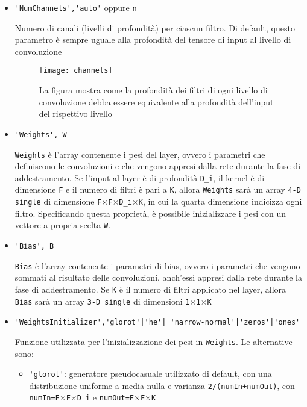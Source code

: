 \begin{itemize}
	\item \verb|'NumChannels','auto'| oppure \verb|n|
	
	Numero di canali (livelli di profondità) per ciascun filtro. Di default, questo parametro è sempre uguale alla profondità del tensore di input al livello di convoluzione
	
	\begin{figure}[h]
		\centering
		\texttt{[image: channels]}
		\caption[Profondità dei filtri attraverso una CNN]{La figura mostra come la profondità dei filtri di ogni livello di convoluzione debba essere equivalente alla profondità dell'input del rispettivo livello}
		\label{fig:channels}
	\end{figure}

	\item \verb|'Weights', W|
	
	\verb|Weights| è l'array contenente i pesi del layer, ovvero i parametri che definiscono le convoluzioni e che vengono appresi dalla rete durante la fase di addestramento. Se l'input al layer è di profondità \verb|D_i|, il kernel è di dimensione \verb|F| e il numero di filtri è pari a \verb|K|, allora \verb|Weights| sarà un array \verb|4-D single| di dimensione \verb|F|$ \times $\verb|F|$ \times $\verb|D_i|$ \times $\verb|K|, in cui la quarta dimensione indicizza ogni filtro. Specificando questa proprietà, è possibile inizializzare i pesi con un vettore a propria scelta \verb|W|.
	
	\item \verb|'Bias', B|
	
	\verb|Bias| è l'array contenente i parametri di bias, ovvero i parametri che vengono sommati al risultato delle convoluzioni, anch'essi appresi dalla rete durante la fase di addestramento. Se \verb|K| è il numero di filtri applicato nel layer, allora \verb|Bias| sarà un array \verb|3-D single| di dimensioni \verb|1|$\times$\verb|1|$\times$\verb|K|
	
	\item \verb+'WeightsInitializer','glorot'|'he'| 'narrow-normal'|'zeros'|'ones'+
	
	Funzione utilizzata per l'inizializzazione dei pesi in \verb|Weights|. Le alternative sono:
	
	\begin{itemize}
		\item \verb|'glorot'|: generatore pseudocasuale utilizzato di default, con una distribuzione uniforme a media nulla e varianza \verb|2/(numIn+numOut)|, con \verb|numIn=F|$\times$\verb|F|$\times$\verb|D_i| e \verb|numOut=F|$\times$\verb|F|$\times$\verb|K|
		

\end{itemize}
\end{itemize}

